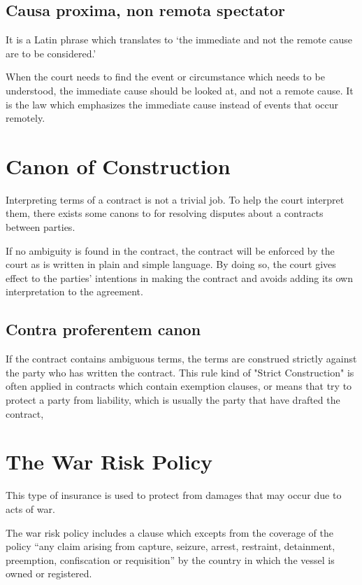 \subsection{Causa proxima, non remota spectator}

It is a Latin phrase which translates to ‘the immediate and not the remote cause are to be considered.’

When the court needs to find the event or circumstance which needs to be understood, the immediate cause should be looked at, and not a remote cause. It is the law which emphasizes the immediate cause instead of events that occur remotely.

\section{Canon of Construction}

Interpreting terms of a contract is not a trivial job. To help the court interpret them, there exists some canons to for resolving disputes about a contracts between parties.

If no ambiguity is found in the contract, the contract will be enforced by the court as is written in plain and simple language. By doing so, the court gives effect to the parties' intentions in making the contract and avoids adding its own interpretation to the agreement.


\subsection{Contra proferentem canon}
If the contract contains ambiguous terms, the terms are construed strictly  against the party who has written the contract. This rule kind of "Strict Construction" is often applied in contracts which contain exemption clauses, or means that try to protect a party from liability, which is usually the party that have drafted the contract,

\section{The War Risk Policy}

This type of insurance is used to protect from damages that may occur due to acts of war.

The war risk policy includes a clause which excepts from the coverage of the policy “any claim arising from capture, seizure, arrest, restraint, detainment, preemption, confiscation or requisition” by the country in which the vessel is owned or registered.

